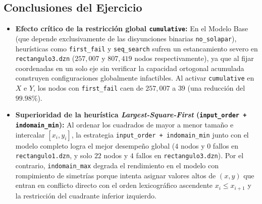 \subsection{Conclusiones del Ejercicio}
\begin{itemize}
    \item \textbf{Efecto crítico de la restricción global \texttt{cumulative}:} En el Modelo Base (que depende exclusivamente de las disyunciones binarias \texttt{no\_solapar}), heurísticas como \texttt{first\_fail} y \texttt{seq\_search} sufren un estancamiento severo en \texttt{rectangulo3.dzn} ($257{,}007$ y $807{,}419$ nodos respectivamente), ya que al fijar coordenadas en un solo eje sin verificar la capacidad ortogonal acumulada construyen configuraciones globalmente infactibles. Al activar \texttt{cumulative} en $X$ e $Y$, los nodos con \texttt{first\_fail} caen de $257{,}007$ a $39$ (una reducción del $99.98\%$).
    \item \textbf{Superioridad de la heurística \textit{Largest-Square-First} (\texttt{input\_order + indomain\_min}):} Al ordenar los cuadrados de mayor a menor tamaño e intercalar $[x_i, y_i]$, la estrategia \texttt{input\_order + indomain\_min} junto con el modelo completo logra el mejor desempeño global ($4$ nodos y $0$ fallos en \texttt{rectangulo1.dzn}, y solo $22$ nodos y $4$ fallos en \texttt{rectangulo3.dzn}). Por el contrario, \texttt{indomain\_max} degrada el rendimiento en el modelo con rompimiento de simetrías porque intenta asignar valores altos de $(x, y)$ que entran en conflicto directo con el orden lexicográfico ascendente $x_i \le x_{i+1}$ y la restricción del cuadrante inferior izquierdo.
\end{itemize}
